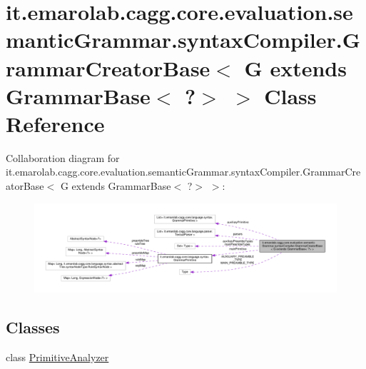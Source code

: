 \hypertarget{classit_1_1emarolab_1_1cagg_1_1core_1_1evaluation_1_1semanticGrammar_1_1syntaxCompiler_1_1Gramma1bf252c3f4def91ad707660fdfe73d0a}{\section{it.\-emarolab.\-cagg.\-core.\-evaluation.\-semantic\-Grammar.\-syntax\-Compiler.\-Grammar\-Creator\-Base$<$ G extends Grammar\-Base$<$ ?$>$ $>$ Class Reference}
\label{classit_1_1emarolab_1_1cagg_1_1core_1_1evaluation_1_1semanticGrammar_1_1syntaxCompiler_1_1Gramma1bf252c3f4def91ad707660fdfe73d0a}
}


Collaboration diagram for it.\-emarolab.\-cagg.\-core.\-evaluation.\-semantic\-Grammar.\-syntax\-Compiler.\-Grammar\-Creator\-Base$<$ G extends Grammar\-Base$<$ ?$>$ $>$\-:\nopagebreak
\begin{figure}[H]
\begin{center}
\leavevmode
\includegraphics[width=350pt]{classit_1_1emarolab_1_1cagg_1_1core_1_1evaluation_1_1semanticGrammar_1_1syntaxCompiler_1_1Gramma6b43c83609c024622d2833fb3ac25647}
\end{center}
\end{figure}
\subsection*{Classes}
\begin{DoxyCompactItemize}
\item 
class \hyperlink{classit_1_1emarolab_1_1cagg_1_1core_1_1evaluation_1_1semanticGrammar_1_1syntaxCompiler_1_1Gramma476c64fc54be5b96aaf6048986cec760}{Primitive\-Analyzer}
\end{DoxyCompactItemize}
